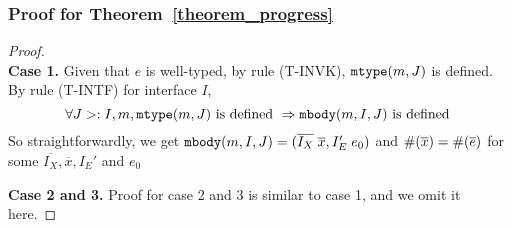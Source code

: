\subsubsection{Proof for Theorem~\ref{theorem_progress}}
\begin{proof}~\\
\noindent \textbf{Case 1.}
Given that $e$ is well-typed, by rule (T-INVK), $\texttt{mtype}(m, J)$ is defined.
By rule (T-INTF) for interface $I$,
    \[ \forall J >: I, m, \texttt{mtype}(m, J) \text{ is defined } \Rightarrow \texttt{mbody}(m, I, J) \text{ is defined } \]
So straightforwardly, we get $ \texttt{mbody}(m, I, J) = (\overline{I_X} \; \overline{x}, I'_E \; e_0) $ and
         $\#(\overline{x}) = \#(\overline{e})$ for some $\overline{I_X}, \overline{x}, I_E'$ and $e_0$
         
\noindent \textbf{Case 2 and 3.} Proof for case 2 and 3 is similar to case 1, and we omit it here.
\end{proof}
